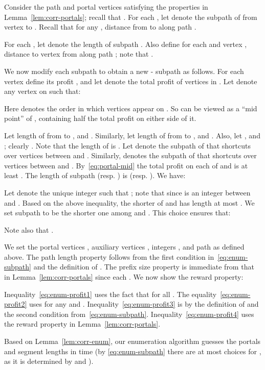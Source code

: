 \documentclass[11pt,letterpaper]{article}
\numberwithin{algorithm}{section}
\newenvironment{proof}{

\noindent{\bf Proof:}}
{\hfill


}
\begin{document}
\begin{proof}
Consider the path  and portal vertices  satisfying the properties in Lemma~\ref{lem:corr-portals}; recall that . For each , let  denote the subpath of  from vertex  to . Recall that for any ,  distance from  to  along path .

For each , let  denote the length of subpath . Also define for each  and vertex ,  distance to vertex  from  along path ; note that .

We now modify each subpath  to obtain a new - subpath  as follows. For each vertex  define its profit , and let  denote the total profit of vertices in . Let  denote any vertex on  such that:

Here  denotes the order in which vertices appear on . So  can be viewed as a ``mid point'' of , containing half the total profit on either side of it.

Let  length of  from  to , and . Similarly, let  length of  from  to , and . Also, let ,  and ; clearly . Note that the length of  is . Let  denote the subpath   of  that shortcuts over vertices between  and . Similarly,  denotes the subpath   of  that shortcuts over vertices between  and . By~\eqref{eq:portal-mid} the total profit on each of  and  is at least .
The length of subpath  (resp. ) is  (resp. ). We have:


Let  denote the unique integer such that ; note that  since  is an integer between  and . Based on the above inequality, the shorter of  and  has length at most . We set subpath  to be the shorter one among  and . This choice ensures that:

Note also that .


We set the portal vertices , auxiliary vertices , integers , and path  as defined above.  The path length property follows from the first condition in~\eqref{eq:enum-subpath} and the definition of . The prefix size property is immediate from that in Lemma~\ref{lem:corr-portals} since each .
We now show the reward property:

Inequality~\eqref{eq:enum-profit1} uses the fact that  for all . The  equality~\eqref{eq:enum-profit2} uses  for any  and . Inequality~\eqref{eq:enum-profit3} is by the definition of  and the second condition from~\eqref{eq:enum-subpath}. Inequality~\eqref{eq:enum-profit4} uses the reward property in Lemma~\ref{lem:corr-portals}.
\end{proof}
Based on Lemma~\ref{lem:corr-enum}, our enumeration algorithm guesses the  portals  and segment lengths  in time  (by 
\eqref{eq:enum-subpath} there are at most  choices for , as it is determined by   and ). 
\end{document}
